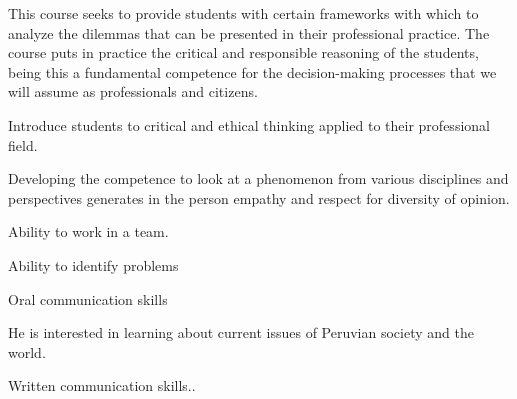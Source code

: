 \begin{syllabus}


\begin{justification}
This course seeks to provide students with certain frameworks with which to analyze the dilemmas that can be presented in their professional practice. The course puts in practice the critical and responsible reasoning of the students, being this a fundamental competence for the decision-making processes that we will assume as professionals and citizens.
\end{justification}

\begin{goals}
\item Introduce students to critical and ethical thinking applied to their professional field.
\item Developing the competence to look at a phenomenon from various disciplines and perspectives generates in the person empathy and respect for diversity of opinion.
\item Ability to work in a team.
\item Ability to identify problems
\item Oral communication skills
\item He is interested in learning about current issues of Peruvian society and the world.
\item Written communication skills..
\end{goals}


\begin{outcomes}
    \item {}
    \item {}
    \item {}
    \item {}
    \item {}
\end{outcomes}

\begin{competences}
    \item {}
    \item {}
    \item {}
    \item {}
\end{competences}



\end{syllabus}
